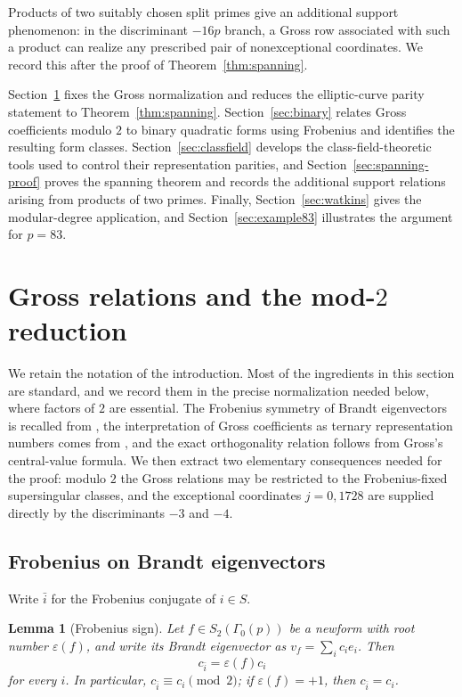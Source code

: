 \documentclass[11pt]{amsart}
\newtheorem{lemma}[theorem]{Lemma}
\theoremstyle{definition}
\theoremstyle{remark}
\begin{document}
Products of two suitably chosen split primes give an additional support
phenomenon: in the discriminant $-16p$ branch, a Gross row associated with
such a product can realize any prescribed pair of nonexceptional
coordinates. We record this after the proof of
Theorem~\ref{thm:spanning}.

Section~\ref{sec:gross} fixes the Gross normalization and reduces the
elliptic-curve parity statement to Theorem~\ref{thm:spanning}.
Section~\ref{sec:binary} relates Gross coefficients modulo $2$ to binary
quadratic forms using Frobenius and identifies the resulting form classes.
Section~\ref{sec:classfield} develops the class-field-theoretic tools used
to control their representation parities, and
Section~\ref{sec:spanning-proof} proves the spanning theorem and records
the additional support relations arising from products of two primes.
Finally, Section~\ref{sec:watkins} gives the modular-degree application,
and Section~\ref{sec:example83} illustrates the argument for $p=83$.

\section{Gross relations and the \texorpdfstring{mod-$2$}{mod-2} reduction}\label{sec:gross}

We retain the notation of the introduction. Most of the ingredients in this
section are standard, and we record them in the precise normalization needed
below, where factors of $2$ are essential. The Frobenius symmetry of Brandt
eigenvectors is recalled from \cite[Propositions~18--19]{KazalickiKohen2017},
the interpretation of Gross coefficients as ternary representation numbers
comes from \cite[Section~12, in particular Proposition~12.9]{Gross1987},
and the exact orthogonality relation follows from Gross's central-value
formula. We then extract two elementary consequences needed for the proof:
modulo $2$ the Gross relations may be restricted to the Frobenius-fixed
supersingular classes, and the exceptional coordinates $j=0,1728$ are
supplied directly by the discriminants $-3$ and $-4$.

\subsection{Frobenius on Brandt eigenvectors}

Write $\bar i$ for the Frobenius conjugate of $i\in S$.

\begin{lemma}[Frobenius sign]\label{lem:frob-sign}
Let $f\in S_2(\Gamma_0(p))$ be a newform with root number $\varepsilon(f)$, and write its Brandt eigenvector as $v_f=\sum_i c_i e_i$.  Then
\[
  c_{\bar i}=\varepsilon(f)c_i
\]
for every $i$.  In particular, $c_{\bar i}\equiv c_i\pmod2$; if $\varepsilon(f)=+1$, then $c_{\bar i}=c_i$.
\end{lemma}
\end{document}
